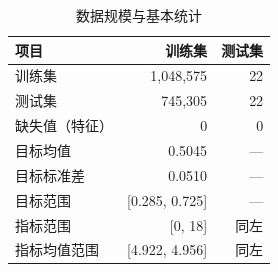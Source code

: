 \begin{table}[htbp]
\centering
\caption{数据规模与基本统计}
\label{tab:data}
\small
\begin{tabular}{lrr}
\toprule
项目 & 训练集 & 测试集 \\
\midrule
训练集 & 1,048,575 & 22 \\
测试集 & 745,305 & 22 \\
缺失值（特征） & 0 & 0 \\
目标均值 & 0.5045 & — \\
目标标准差 & 0.0510 & — \\
目标范围 & [0.285, 0.725] & — \\
指标范围 & [0, 18] & 同左 \\
指标均值范围 & [4.922, 4.956] & 同左 \\
\bottomrule
\end{tabular}
\end{table}
